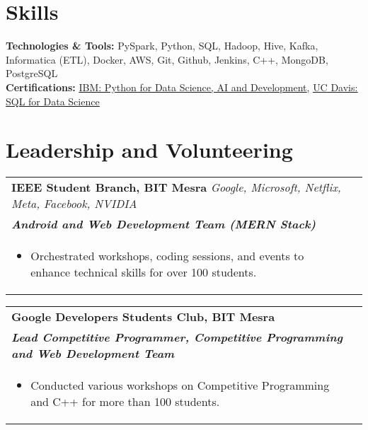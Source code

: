 \documentclass[a4paper,8pt]{article}
\begin{document}
\section{Skills}
\color[HTML]{1C033C}\textbf{Technologies \& Tools:} \color[HTML]{371e77}PySpark, Python, SQL, Hadoop, Hive, Kafka, Informatica (ETL), Docker, AWS, Git, Github, Jenkins, C++, MongoDB, PostgreSQL \\[4pt]
\color[HTML]{1C033C}\textbf{Certifications:} 
\color[HTML]{371e77}\uline{\href{https://coursera.org/share/44a2b142b461949455bcbdbe0c65d9df}{IBM: Python for Data Science, AI and Development}}, 
\color[HTML]{371e77} \uline{\href{https://coursera.org/share/f110dc00423a73fad3dbe4822b3a1c46}{UC Davis: SQL for Data Science}}

\section{Leadership and Volunteering}
\begin{tabularx}{\linewidth}{ @{}l r@{} }
\color[HTML]{1C033C} \textbf{IEEE Student Branch, BIT Mesra} \hfill \color[HTML]{371e77} 
\color[HTML]{FFFFFF} \textit{Google, Microsoft, Netflix, Meta, Facebook, NVIDIA}\\[4pt]
\color[HTML]{371e77}\textbf{\textit{Android and Web Development Team (MERN Stack)}} \\[4pt]
\begin{minipage}[t]{\linewidth}
    \begin{itemize}[nosep,after=\strut, leftmargin=2em, itemsep=1pt]
        \item Orchestrated workshops, coding sessions, and events to enhance technical skills for over 100 students.
    \end{itemize}
\end{minipage}
\end{tabularx}

\begin{tabularx}{\linewidth}{ @{}l r@{} }
\color[HTML]{1C033C} \textbf{Google Developers Students Club, BIT Mesra} \hfill \color[HTML]{371e77}  \\[4pt]
\color[HTML]{371e77}\textbf{\textit{Lead Competitive Programmer, Competitive Programming and Web Development Team }} \\[4pt]
\begin{minipage}[t]{\linewidth}
    \begin{itemize}[nosep,after=\strut, leftmargin=2em, itemsep=1pt]
        \item Conducted various workshops on Competitive Programming and C++ for more than 100 students.
    \end{itemize}
\end{minipage}
\end{tabularx}
\end{document}
